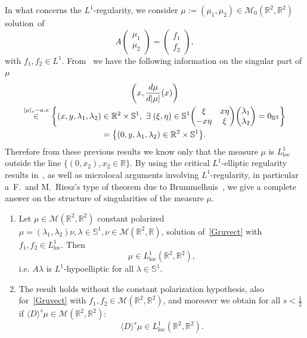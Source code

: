 \documentclass[AHL,Unicode,longabstracts,published]{cedram}
\DeclareMathOperator{\locc}{loc}
\newcommand{\bbR}{\mathbb{R}}
\newcommand{\bbS}{\mathbb{S}}
\newcommand{\clM}{\mathcal{M}}
\let\originalleft\left
\let\originalright\right
\renewcommand{\left}{\mathopen{}\mathclose\bgroup\originalleft}
\renewcommand{\right}{\aftergroup\egroup\originalright}
\newcommand*{\relabel}{\renewcommand{\labelenumi}{(\theenumi)}}
\newcommand*{\romanenumi}{\renewcommand*{\theenumi}{\roman{enumi}}\relabel}
\let\oldexists\exists
\renewcommand*{\exists}{\mathrel{\oldexists}}
\begin{document}
In what concerns the $L^1$-regularity, we consider $\mu:=(\mu_1,\mu_2)\in \clM_0(\bbR^2,\bbR^2)$ solution~of
\begin{equation}\label{Gruvect}
A
\begin{pmatrix}
\mu_1\\ \mu_2
\end{pmatrix}
=
\begin{pmatrix}
f_1\\ f_2
\end{pmatrix},
\end{equation}
with $f_1,f_2\in L^1$. From~\cite{DePRi} we have the following information on the singular part of $\mu$
\begin{multline*}
\left(x,\frac{d\mu}{d|\mu|}(x)\right)\\
\overset{|\mu|_s-a.e}{\in}\left\{(x,y,\lambda_1,\lambda_2)\in\bbR^2\times \bbS^1,\ \exists (\xi,\eta)\in\bbS^1
\begin{pmatrix}
\xi & x\eta\\ -x\eta & \xi
\end{pmatrix}
\begin{pmatrix}
\lambda_1\\ \lambda_2
\end{pmatrix}
=0_{\bbR^2}\right\}\\
=\left\{(0,y,\lambda_1,\lambda_2)\in\bbR^2\times \bbS^1\right\}.
\end{multline*}
Therefore from these previous results we know only that the measure $\mu$ is $L^1_{\locc}$ outside the line $\{(0,x_2), x_2\in\bbR\}$. By using the critical $L^1$-elliptic regularity results in~\cite{BBWFL1}, as well as microlocal arguments involving $L^1$-regularity, in particular a~F.~and M.~Riesz's type of theorem due to Brummelhuis~\cite{Br}, we give a complete answer on the structure of singularities of the measure $\mu$.



\begin{theo}\leavevmode
\label{thvectL1}
\begin{enumerate}\romanenumi
\item\label{theo1.4.1}%
\!\!
Let $\mu\!\in\! \clM(\bbR^2,\bbR^2)$ constant polarized $\mu=(\lambda_1,\lambda_2)\nu, \lambda\in\bbS^1,\nu\!\in\! \clM(\bbR^2,\bbR)$, solution of~\eqref{Gruvect} with $f_1,f_2\in L^1_{\locc}$. Then
\[
\mu\in L^1_{\locc}(\bbR^2,\bbR^2),
\]
i.e. $A\lambda$ is $L^1$-hypoelliptic for all $\lambda\in\bbS^1$.


\item\label{theo1.4.2} The result holds without the constant polarization hypothesis, also for~\eqref{Gruvect} with $f_1,f_2 \in \clM(\bbR^2,\bbR^2)$, and moreover we obtain for all $s<\frac 12$ if $\langle D\rangle^{s}\mu\in \clM(\bbR^2,\bbR^2)$:
\[
\langle D\rangle^{s}\mu\in L^1_{\locc}(\bbR^2,\bbR^2).
\]
\end{enumerate}
\end{theo}
\end{document}
